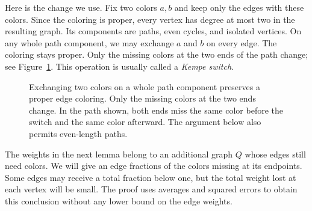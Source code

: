 \documentclass[11pt]{article}
\theoremstyle{definition}\newtheorem{algorithm}{Algorithm}[section]
\numberwithin{equation}{section}
\theoremstyle{remark}\newtheorem*{remark}{Remark}
\begin{document}
Here is the change we use. Fix two colors $a,b$ and keep only the edges
with these colors. Since the coloring is proper, every vertex has degree
at most two in the resulting graph. Its components are paths, even cycles,
and isolated vertices. On any whole path component, we may exchange $a$ and $b$ on every
edge. The coloring stays proper. Only the missing colors at the two ends
of the path change; see Figure~\ref{fig:path-switch}. This operation is usually called a \emph{Kempe switch}.

\begin{figure}[htbp]
\centering
{}
\caption{Exchanging two colors on a whole path component preserves a
proper edge coloring. Only the missing colors at the two ends change. In the path shown,
both ends miss the same color before the switch and the same color
afterward. The argument below also permits even-length paths.}
\label{fig:path-switch}
\end{figure}


The weights in the next lemma belong to an additional graph $Q$ whose
edges still need colors. We will give an edge fractions of the colors
missing at its endpoints. Some edges may receive a total fraction below
one, but the total weight lost at each vertex will be small. The proof
uses averages and squared errors to obtain this conclusion without any
lower bound on the edge weights.
\end{document}
